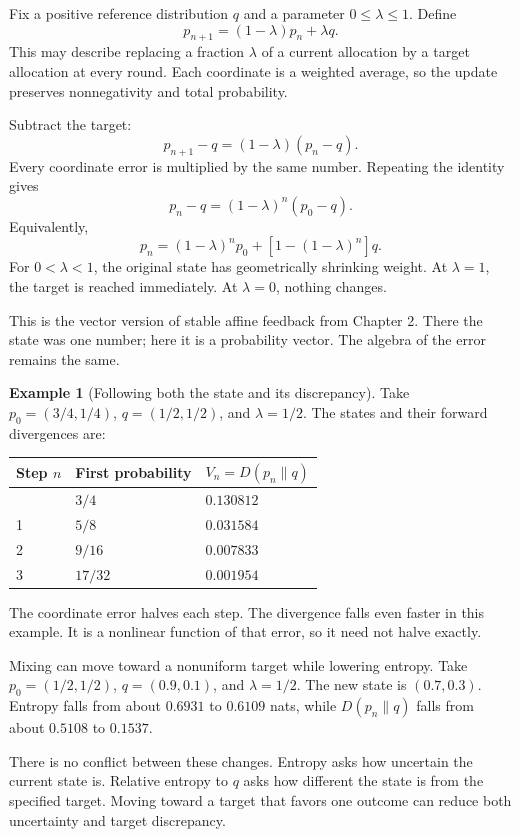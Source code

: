 \documentclass[11pt,oneside,openany]{book}
\theoremstyle{definition}
\newtheorem{example}{Example}[chapter]
\theoremstyle{remark}
\numberwithin{equation}{chapter}
\begin{document}
Fix a positive reference distribution \(q\) and a parameter \(0\leq\lambda\leq1\). Define \[p_{n+1}=(1-\lambda)p_n+\lambda q.\] This may describe replacing a fraction \(\lambda\) of a current allocation by a target allocation at every round. Each coordinate is a weighted average, so the update preserves nonnegativity and total probability.

Subtract the target: \[p_{n+1}-q=(1-\lambda)(p_n-q).\] Every coordinate error is multiplied by the same number. Repeating the identity gives \[\boxed{p_n-q=(1-\lambda)^n(p_0-q).}\] Equivalently, \[p_n=(1-\lambda)^n p_0+[1-(1-\lambda)^n]q.\] For \(0<\lambda<1\), the original state has geometrically shrinking weight. At \(\lambda=1\), the target is reached immediately. At \(\lambda=0\), nothing changes.

This is the vector version of stable affine feedback from Chapter 2. There the state was one number; here it is a probability vector. The algebra of the error remains the same.

\begin{example}[Following both the state and its discrepancy]

Take \(p_0=(3/4,1/4)\), \(q=(1/2,1/2)\), and \(\lambda=1/2\). The states and their forward divergences are:

\begin{longtable}[]{@{}lll@{}}
\toprule\noalign{}
Step \(n\) & First probability & \(V_n=D(p_n\|q)\) \\
\midrule\noalign{}
\endhead
\bottomrule\noalign{}
\endlastfoot
0 & \(3/4\) & \(0.130812\) \\
1 & \(5/8\) & \(0.031584\) \\
2 & \(9/16\) & \(0.007833\) \\
3 & \(17/32\) & \(0.001954\) \\
\end{longtable}

The coordinate error halves each step. The divergence falls even faster in this example. It is a nonlinear function of that error, so it need not halve exactly.

\end{example}

Mixing can move toward a nonuniform target while lowering entropy. Take \(p_0=(1/2,1/2)\), \(q=(0.9,0.1)\), and \(\lambda=1/2\). The new state is \((0.7,0.3)\). Entropy falls from about \(0.6931\) to \(0.6109\) nats, while \(D(p_n\|q)\) falls from about \(0.5108\) to \(0.1537\).

There is no conflict between these changes. Entropy asks how uncertain the current state is. Relative entropy to \(q\) asks how different the state is from the specified target. Moving toward a target that favors one outcome can reduce both uncertainty and target discrepancy.
\end{document}
